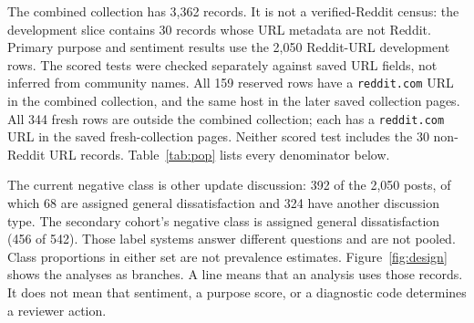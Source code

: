 \documentclass[conference,letterpaper]{IEEEtran}
\begin{document}
The combined collection has 3,362 records. It is not a verified-Reddit census: the development slice contains 30 records whose URL metadata are not Reddit. Primary purpose and sentiment results use the 2,050 Reddit-URL development rows. The scored tests were checked separately against saved URL fields, not inferred from community names. All 159 reserved rows have a \texttt{reddit.com} URL in the combined collection, and the same host in the later saved collection pages. All 344 fresh rows are outside the combined collection; each has a \texttt{reddit.com} URL in the saved fresh-collection pages. Neither scored test includes the 30 non-Reddit URL records. Table~\ref{tab:pop} lists every denominator below.

The current negative class is other update discussion: 392 of the 2,050 posts, of which 68 are assigned general dissatisfaction and 324 have another discussion type. The secondary cohort's negative class is assigned general dissatisfaction (456 of 542). Those label systems answer different questions and are not pooled. Class proportions in either set are not prevalence estimates. Figure~\ref{fig:design} shows the analyses as branches. A line means that an analysis uses those records. It does not mean that sentiment, a purpose score, or a diagnostic code determines a reviewer action.
\end{document}
